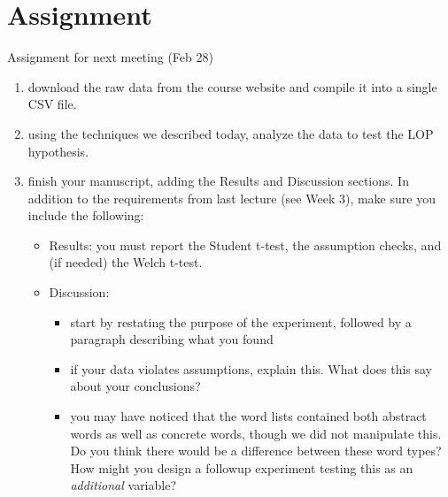 \documentclass[11pt]{article}
\begin{document}
\section*{Assignment}
\label{sec-3}

Assignment for next meeting (Feb 28)

\begin{enumerate}
\item download the raw data from the course website and compile it into a single CSV file.

\item using the techniques we described today, analyze the data to test the LOP hypothesis.

\item finish your manuscript, adding the Results and Discussion sections.  In addition to the requirements from last lecture (see Week 3), make sure you include the following:
\begin{itemize}
\item Results: you must report the Student t-test, the assumption checks, and (if needed) the Welch t-test.
\item Discussion: 
\begin{itemize}
\item start by restating the purpose of the experiment, followed by a paragraph describing what you found
\item if your data violates assumptions, explain this.  What does this say about your conclusions?
\item you may have noticed that the word lists contained both abstract words as well as concrete words, though we did not manipulate this.  Do you think there would be a difference between these word types?  How might you design a followup experiment testing this as an \emph{additional} variable?
\end{itemize}
\end{itemize}
\end{enumerate}
\end{document}
